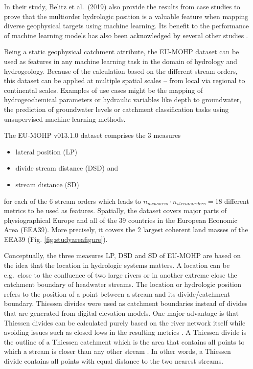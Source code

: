\documentclass[fleqn,10pt]{wlscirep}
\providecommand{\tightlist}{%
  \setlength{\itemsep}{0pt}\setlength{\parskip}{0pt}}
\begin{document}
In their study, Belitz et al.~(2019)\cite{belitz_multiorder_2019} also provide the results from case studies to prove that the multiorder hydrologic position is a valuable feature when mapping diverse geophysical targets using machine learning. Its benefit to the performance of machine learning models has also been acknowledged by several other studies \cite{degnan_relation_2020, knierim_using_2020, stackelberg_machine_2021}.

Being a static geophysical catchment attribute, the EU-MOHP dataset can be used as features in any machine learning task in the domain of hydrology and hydrogeology. Because of the calculation based on the different stream orders, this dataset can be applied at multiple spatial scales -- from local via regional to continental scales. Examples of use cases might be the mapping of hydrogeochemical parameters or hydraulic variables like depth to groundwater, the prediction of groundwater levels or catchment classification tasks using unsupervised machine learning methods.

The EU-MOHP v013.1.0 dataset comprises the 3 measures

\begin{itemize}
\tightlist
\item
  lateral position (LP)
\item
  divide stream distance (DSD) and
\item
  stream distance (SD)
\end{itemize}

for each of the 6 stream orders which leads to \(n_{measures}\cdot n_{streamorders} = 18\) different metrics to be used as features. Spatially, the dataset covers major parts of physiographical Europe and all of the 39 countries in the European Economic Area (EEA39). More precisely, it covers the 2 largest coherent land masses of the EEA39 (Fig. \ref{fig:studyareafigure}).

Conceptually, the three measures LP, DSD and SD of EU-MOHP are based on the idea that the location in hydrologic systems matters\cite{belitz_multiorder_2019}. A location can be e.g.~close to the confluence of two large rivers or in another extreme close the catchment boundary of headwater streams. The location or hydrologic position refers to the position of a point between a stream and its divide/catchment boundary. Thiessen divides were used as catchment boundaries instead of divides that are generated from digital elevation models. One major advantage is that Thiessen divides can be calculated purely based on the river network itself while avoiding issues such as closed lows in the resulting metrics \cite{belitz_multiorder_2019}. A Thiessen divide is the outline of a Thiessen catchment which is the area that contains all points to which a stream is closer than any other stream \cite{johnston_evaluation_2009}. In other words, a Thiessen divide contains all points with equal distance to the two nearest streams.
\end{document}
